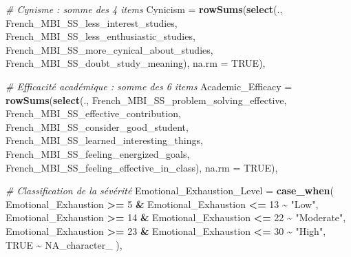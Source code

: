 \documentclass[
]{article}
\newenvironment{Shaded}{\begin{snugshade}}{\end{snugshade}}
\newcommand{\AttributeTok}[1]{\textcolor[rgb]{0.13,0.29,0.53}{#1}}
\newcommand{\CommentTok}[1]{\textcolor[rgb]{0.56,0.35,0.01}{\textit{#1}}}
\newcommand{\ConstantTok}[1]{\textcolor[rgb]{0.56,0.35,0.01}{#1}}
\newcommand{\DecValTok}[1]{\textcolor[rgb]{0.00,0.00,0.81}{#1}}
\newcommand{\FunctionTok}[1]{\textcolor[rgb]{0.13,0.29,0.53}{\textbf{#1}}}
\newcommand{\NormalTok}[1]{#1}
\newcommand{\SpecialCharTok}[1]{\textcolor[rgb]{0.81,0.36,0.00}{\textbf{#1}}}
\newcommand{\StringTok}[1]{\textcolor[rgb]{0.31,0.60,0.02}{#1}}
\begin{document}
\begin{Shaded}
\begin{Highlighting}[]
    \CommentTok{\# Cynisme : somme des 4 items}
    \AttributeTok{Cynicism =} \FunctionTok{rowSums}\NormalTok{(}\FunctionTok{select}\NormalTok{(., }
\NormalTok{                              French\_MBI\_SS\_less\_interest\_studies,}
\NormalTok{                              French\_MBI\_SS\_less\_enthusiastic\_studies,}
\NormalTok{                              French\_MBI\_SS\_more\_cynical\_about\_studies,}
\NormalTok{                              French\_MBI\_SS\_doubt\_study\_meaning), }\AttributeTok{na.rm =} \ConstantTok{TRUE}\NormalTok{),}
    
    \CommentTok{\# Efficacité académique : somme des 6 items}
    \AttributeTok{Academic\_Efficacy =} \FunctionTok{rowSums}\NormalTok{(}\FunctionTok{select}\NormalTok{(., }
\NormalTok{                                       French\_MBI\_SS\_problem\_solving\_effective,}
\NormalTok{                                       French\_MBI\_SS\_effective\_contribution,}
\NormalTok{                                       French\_MBI\_SS\_consider\_good\_student,}
\NormalTok{                                       French\_MBI\_SS\_learned\_interesting\_things,}
\NormalTok{                                       French\_MBI\_SS\_feeling\_energized\_goals,}
\NormalTok{                                       French\_MBI\_SS\_feeling\_effective\_in\_class), }\AttributeTok{na.rm =} \ConstantTok{TRUE}\NormalTok{),}
    
    
    \CommentTok{\# Classification de la sévérité}
    \AttributeTok{Emotional\_Exhaustion\_Level =} \FunctionTok{case\_when}\NormalTok{(}
\NormalTok{      Emotional\_Exhaustion }\SpecialCharTok{\textgreater{}=} \DecValTok{5}  \SpecialCharTok{\&}\NormalTok{ Emotional\_Exhaustion }\SpecialCharTok{\textless{}=} \DecValTok{13} \SpecialCharTok{\textasciitilde{}} \StringTok{"Low"}\NormalTok{,}
\NormalTok{      Emotional\_Exhaustion }\SpecialCharTok{\textgreater{}=} \DecValTok{14} \SpecialCharTok{\&}\NormalTok{ Emotional\_Exhaustion }\SpecialCharTok{\textless{}=} \DecValTok{22} \SpecialCharTok{\textasciitilde{}} \StringTok{"Moderate"}\NormalTok{,}
\NormalTok{      Emotional\_Exhaustion }\SpecialCharTok{\textgreater{}=} \DecValTok{23} \SpecialCharTok{\&}\NormalTok{ Emotional\_Exhaustion }\SpecialCharTok{\textless{}=} \DecValTok{30} \SpecialCharTok{\textasciitilde{}} \StringTok{"High"}\NormalTok{,}
      \ConstantTok{TRUE} \SpecialCharTok{\textasciitilde{}} \ConstantTok{NA\_character\_}
\NormalTok{    ),}
    

\end{Highlighting}
\end{Shaded}
\end{document}
